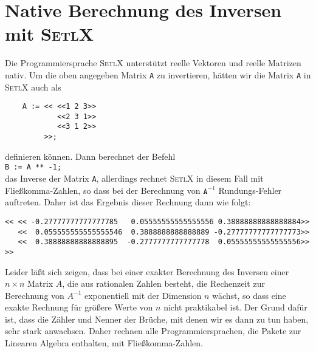 \section{Native Berechnung des Inversen mit \textsc{SetlX}}
Die Programmiersprache \textsc{SetlX} unterst\"utzt reelle Vektoren und reelle Matrizen nativ.  Um die oben
angegeben Matrix \texttt{A} zu invertieren, h\"atten wir die Matrix \texttt{A} in \textsc{SetlX} auch als
\begin{verbatim}
    A := << <<1 2 3>>
            <<2 3 1>>
            <<3 1 2>>
         >>;
\end{verbatim}
definieren k\"onnen.  Dann berechnet der Befehl
\\[0.2cm]
\hspace*{1.3cm}
\texttt{B := A ** -1;}
\\[0.2cm]
das Inverse der Matrix \texttt{A}, allerdings rechnet \textsc{SetlX} in diesem Fall mit
Flie{\ss}komma-Zahlen, so dass bei der Berechnung von $\mathtt{A}^{-1}$ Rundungs-Fehler auftreten.
Daher ist das Ergebnis dieser Rechnung dann wie folgt:
\begin{verbatim}
<< << -0.27777777777777785   0.05555555555555556 0.38888888888888884>>
   <<  0.055555555555555546  0.3888888888888889 -0.27777777777777773>>
   <<  0.38888888888888895  -0.2777777777777778  0.05555555555555556>>
>>
\end{verbatim}
Leider l\"a{\ss}t sich zeigen, dass bei einer exakter Berechnung des Inversen einer $n \times n$ Matrix
$A$, die aus rationalen Zahlen besteht, die Rechenzeit zur Berechnung von $A^{-1}$ exponentiell mit
der Dimension $n$ w\"achst, so dass eine exakte Rechnung f\"ur gr\"o{\ss}ere Werte von $n$ nicht
praktikabel ist.  Der Grund daf\"ur ist, dass die Z\"ahler und Nenner der Br\"uche, mit denen wir es
dann zu tun haben, sehr stark anwachsen.  Daher rechnen alle Programmiersprachen, die Pakete zur Linearen
Algebra enthalten, mit Flie{\ss}komma-Zahlen.

